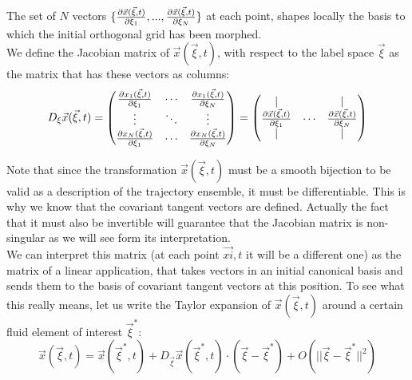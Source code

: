 \documentclass[11pt, a4paper]{article} %
\begin{document}
{The set of $N$ vectors $\{\pdv{\vec{x}(\vec{\xi},t)}{\xi_1},...,\pdv{\vec{x}(\vec{\xi},t)}{\xi_N} \}$ at each point, shapes locally the basis to which the initial orthogonal grid has been morphed.\\

We define the Jacobian matrix of $\vec{x}(\vec{\xi},t)$, with respect to the label space $\vec{\xi}$ as the matrix that has these vectors as columns:
\begin{equation}
D_\xi\vec{x}(\vec{\xi},t)=\begin{pmatrix}
\pdv{x_1(\vec{\xi},t)}{\xi_1} & \cdots & \pdv{x_1(\vec{\xi},t)}{\xi_N}\\
\vdots&\ddots&\vdots \\
\pdv{x_N(\vec{\xi},t)}{\xi_1} & \cdots & \pdv{x_N(\vec{\xi},t)}{\xi_N}
\end{pmatrix}=\begin{pmatrix}
|& &|\\
\pdv{\vec{x}(\vec{\xi},t)}{\xi_1} & \cdots & \pdv{\vec{x}(\vec{\xi},t)}{\xi_N}\\
|& &|
\end{pmatrix}
\end{equation}

Note that since the transformation $\vec{x}(\vec{\xi},t)$ must be a smooth bijection to be valid as a description of the trajectory ensemble, it must be differentiable. This is why we know that the covariant tangent vectors are defined. Actually the fact that it must also be invertible will guarantee that the Jacobian matrix is non-singular as we will see form its interpretation.\\

We can interpret this matrix (at each point $\vec{xi},t$ it will be a different one) as the matrix of a linear application, that takes vectors in an initial canonical basis and sends them to the basis of covariant tangent vectors at this position. To see what this really means, let us write the Taylor expansion of $\vec{x}(\vec{\xi},t)$ around a certain fluid element of interest $\vec{\xi}^*$:
\begin{equation}
\vec{x}(\vec{\xi},t)=\vec{x}(\vec{\xi}^*,t)+D_{\vec{\xi}}\vec{x}(\vec{\xi}^*,t)\cdot (\vec{\xi}-\vec{\xi}^*)+O(||\vec{\xi}-\vec{\xi}^*||^2)
\end{equation}}
\end{document}
